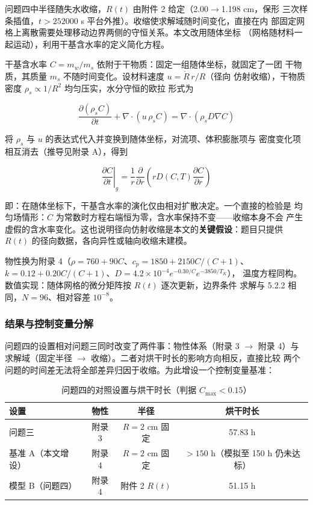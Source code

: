 问题四中半径随失水收缩，$R(t)$ 由附件 2 给定（2.00$\to$1.198 cm，保形
三次样条插值，$t>252000$ s 平台外推）。收缩使求解域随时间变化，直接在内
部固定网格上离散需要处理移动边界两侧的守恒关系。本文改用随体坐标
（网格随材料一起运动），利用干基含水率的定义简化方程。

干基含水率 $C=m_w/m_s$ 依附于干物质：固定一组随体坐标，就固定了一团
干物质，其质量 $m_s$ 不随时间变化。设材料速度 $u=\dot R\,r/R$（径向
仿射收缩），干物质密度 $\rho_s\propto1/R^2$ 均匀压实，水分守恒的欧拉
形式为

\begin{equation}
\frac{\partial(\rho_s C)}{\partial t}+\nabla\cdot(u\,\rho_s C)=\nabla\cdot(\rho_s D\nabla C)
\end{equation}

将 $\rho_s$ 与 $u$ 的表达式代入并变换到随体坐标，对流项、体积膨胀项与
密度变化项相互消去（推导见附录 A），得到

\begin{equation}
\left.\frac{\partial C}{\partial t}\right|_{g}=\frac{1}{r}\frac{\partial}{\partial r}\left(rD(C,T)\frac{\partial C}{\partial r}\right)
\end{equation}

即：在随体坐标下，干基含水率的演化仅由相对扩散决定。一个直接的检验是
均匀场情形：$C$ 为常数时方程右端恒为零，含水率保持不变——收缩本身不会
产生虚假的含水率变化。这也说明径向仿射收缩是本文的\textbf{关键假设}：题目只提供
$R(t)$ 的径向数据，各向异性或轴向收缩未建模。

物性换为附录 4（$\rho=760+90C$、$c_p=1850+2150C/(C+1)$、
$k=0.12+0.20C/(C+1)$、$D=4.2\times10^{-4}e^{-0.30/C}e^{-3850/T_K}$），
温度方程同构。数值实现：随体网格的微分矩阵按 $R(t)$ 逐次更新，边界条件
求解与 5.2.2 相同，$N=96$、相对容差 $10^{-8}$。

\subsubsection{结果与控制变量分解}

问题四的设置相对问题三同时改变了两件事：物性体系（附录 3 $\to$ 附录 4）与
求解域（固定半径 $\to$ 收缩）。二者对烘干时长的影响方向相反，直接比较
两个问题的时间差无法将全部差异归因于收缩。为此增设一个控制变量基准：

\begin{table}[H]
\centering
\caption{问题四的对照设置与烘干时长（判据 $C_{\max}<0.15$）}
\label{tab:control}
\begin{tabular}{lccc}
\toprule
设置 & 物性 & 半径 & 烘干时长 \\
\midrule
问题三 & 附录 3 & $R=2$ cm 固定 & 57.83 h \\
基准 A（本文增设） & 附录 4 & $R=2$ cm 固定 & $>150$ h（模拟至 150 h 仍未达标） \\
模型 B（问题四） & 附录 4 & 附件 2 $R(t)$ & 51.15 h \\
\bottomrule
\end{tabular}
\end{table}

